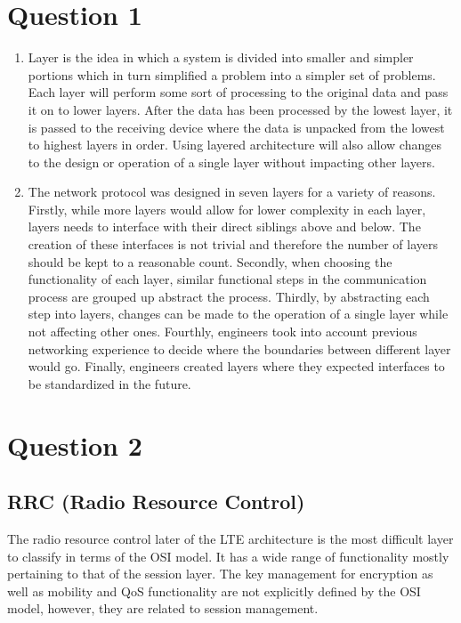 \documentclass[12pt,letterpaper]{article}
\begin{document}
\section*{Question 1}

\begin{enumerate}[label=\alph*)]
  \item
   Layer is the idea in which a system is divided into smaller and simpler
   portions which in turn simplified a problem into a simpler set of problems.
   Each layer will perform some sort of processing to the original
   data and pass it on to lower layers. After the data has been processed by the
   lowest layer, it is passed to the receiving device where the data is unpacked
   from the lowest to highest layers in order. Using layered architecture will also
   allow changes to the design or operation of a single layer without impacting
   other layers.
  \item
   The network protocol was designed in seven layers for a variety of reasons.
   Firstly, while more layers would allow for lower complexity in each layer,
   layers needs to interface with their direct siblings above and below.
   The creation of these interfaces is not trivial and therefore the number of
   layers should be kept to a reasonable count. Secondly, when choosing the functionality
   of each layer, similar functional steps in the communication process are
   grouped up abstract the process. Thirdly, by abstracting each step into layers,
   changes can be made to the operation of a single layer while not affecting other ones.
   Fourthly, engineers took into account previous networking experience to decide where
   the boundaries between different layer would go. Finally, engineers created layers
   where they expected interfaces to be standardized in the future.
\end{enumerate}

\section*{Question 2}
\subsection*{RRC (Radio Resource Control)}
The radio resource control later of the LTE architecture is the most difficult
layer to classify in terms of the OSI model. It has a wide range of functionality
mostly pertaining to that of the session layer. The key management for encryption
as well as mobility and QoS functionality are not explicitly defined by the OSI
model, however, they are related to session management.
\end{document}
